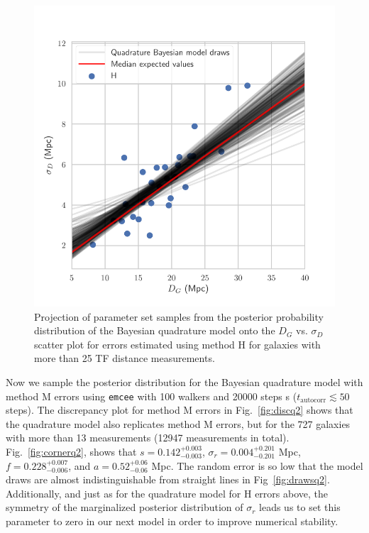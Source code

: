 \documentclass[a4paper,fleqn,usenatbib]{mnras}
\begin{document}
\begin{figure}
	\includegraphics[scale=0.7]{drawsq}
    \caption{Projection of parameter set samples from the posterior probability distribution of the Bayesian quadrature model onto the $D_G$ vs. $\sigma_D$ scatter plot for errors estimated using method H for galaxies with more than 25 TF distance measurements.}
    \label{fig:drawsq}
\end{figure}
Now we sample the posterior distribution for the Bayesian quadrature model with method M errors using \texttt{emcee} with 100 walkers and 20000 steps s ($t_\mathrm{autocorr} \lesssim 50$ steps). The discrepancy plot for method M errors in Fig.~\ref{fig:discq2} shows that the quadrature model also replicates method M errors, but for the 727 galaxies with more than 13 measurements (12947 measurements in total). Fig.~\ref{fig:cornerq2}, shows that $s=0.142_{-0.003}^{+0.003}$, $\sigma_r=0.004_{-0.201}^{+0.201}$ Mpc, $f=0.228_{-0.006}^{+0.007}$, and $a=0.52_{-0.06}^{+0.06}$ Mpc. The random error is so low that the model draws are almost indistinguishable from straight lines in Fig~\ref{fig:drawsq2}. Additionally, and just as for the quadrature model for H errors above, the symmetry of the marginalized posterior distribution of $\sigma_r$ leads us to set this parameter to zero in our next model in order to improve numerical stability.
\end{document}
